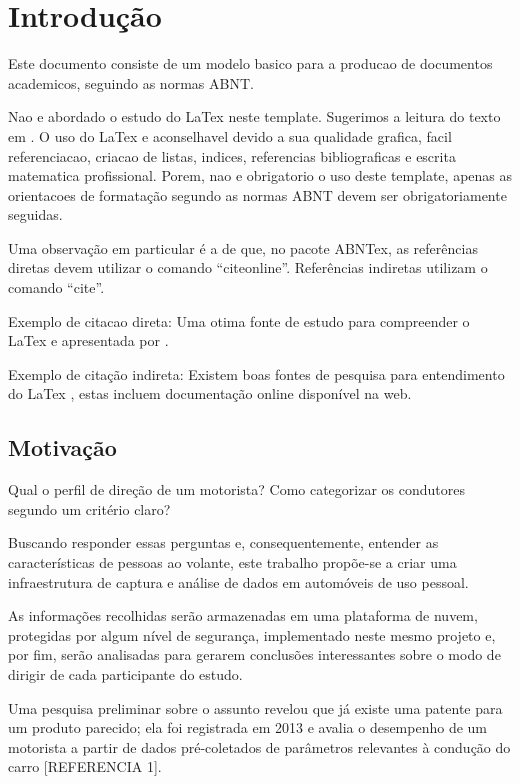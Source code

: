 \chapter{Introdução}\label{CAP:introducao}

Este documento consiste de um modelo basico para a producao de documentos academicos, seguindo as normas ABNT. 

Nao e abordado o estudo do LaTex neste template. Sugerimos a leitura do texto em . O uso do LaTex e aconselhavel devido a sua qualidade grafica, facil referenciacao, criacao de listas, indices, referencias bibliograficas e escrita matematica profissional. Porem, nao e obrigatorio o uso deste template, apenas as orientacoes de formatação segundo as normas ABNT devem ser obrigatoriamente seguidas.

Uma observação em particular é a de que, no pacote ABNTex, as referências diretas devem utilizar o comando ``citeonline''. Referências indiretas utilizam o comando ``cite''.

Exemplo de citacao direta: Uma otima fonte de estudo para compreender o LaTex e apresentada por . 

Exemplo de citação indireta: Existem boas fontes de pesquisa para entendimento do LaTex \cite{Oetiker:1995}, estas incluem documentação online disponível na web.

\section{Motivação}

Qual o perfil de direção de um motorista? Como categorizar os condutores segundo um critério claro?

Buscando responder essas perguntas e, consequentemente, entender as características de pessoas ao volante, este trabalho propõe-se a criar uma infraestrutura de captura e análise de dados em automóveis de uso pessoal.

As informações recolhidas serão armazenadas em uma plataforma de nuvem, protegidas por algum nível de segurança, implementado neste mesmo projeto e, por fim, serão analisadas para gerarem conclusões interessantes sobre o modo de dirigir de cada participante do estudo.
	
Uma pesquisa preliminar sobre o assunto revelou que já existe uma patente para um produto parecido; ela foi registrada em 2013 e avalia o desempenho de um motorista a partir de dados pré-coletados de parâmetros relevantes à condução do carro [REFERENCIA 1].

